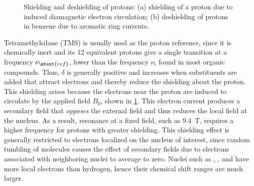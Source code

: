 \documentclass[nobib,nofonts,nols,nohyper]{tufte-handout}
\begin{document}
\begin{figure}[htb]
  \centering
  
  \caption{Shielding and deshielding of protons: (a) shielding of a proton due to induced diamagnetic electron circulation; (b) deshielding of protons in benzene due to aromatic ring currents.}
  \label{fig:shielding}
\end{figure}
  
Tetramethylsilane (TMS) is usually used as the proton reference, since it is chemically inert and its 12 equivalent protons give a single transition at a frequency \( \nu_\mtext{ref} \), lower than the frequency \( \nu_i \) found in most organic compounds. 
Thus, \( \delta \) is generally positive and increases when substituents are added that attract electrons and thereby reduce the shielding about the proton. 
This shielding arises because the electrons near the proton are induced to circulate by the applied field \( B_0 \), shown in \cref{fig:shielding}. 
This electron current produces a secondary field that \emph{opposes} the external field and thus reduces the local field at the nucleus. 
As a result, resonance at a fixed field, such as \qty{9.4}{\tesla}, requires a higher frequency for protons with greater shielding. 
This shielding effect is generally restricted to electrons localized on the nucleus of interest, since random tumbling of molecules causes the effect of secondary fields due to electrons associated with neighboring nuclei to average to zero. 
Nuclei such as , , and  have more local electrons than hydrogen, hence their chemical shift ranges are much larger. 
\end{document}
